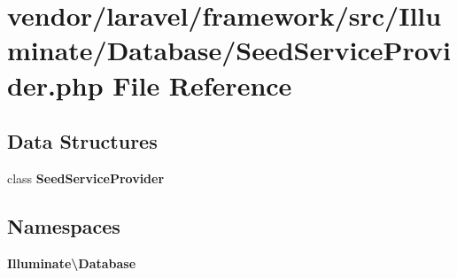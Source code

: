 \section{vendor/laravel/framework/src/\+Illuminate/\+Database/\+Seed\+Service\+Provider.php File Reference}
\label{_seed_service_provider_8php}
\subsection*{Data Structures}
\begin{DoxyCompactItemize}
\item 
class {\bf Seed\+Service\+Provider}
\end{DoxyCompactItemize}
\subsection*{Namespaces}
\begin{DoxyCompactItemize}
\item 
 {\bf Illuminate\textbackslash{}\+Database}
\end{DoxyCompactItemize}
